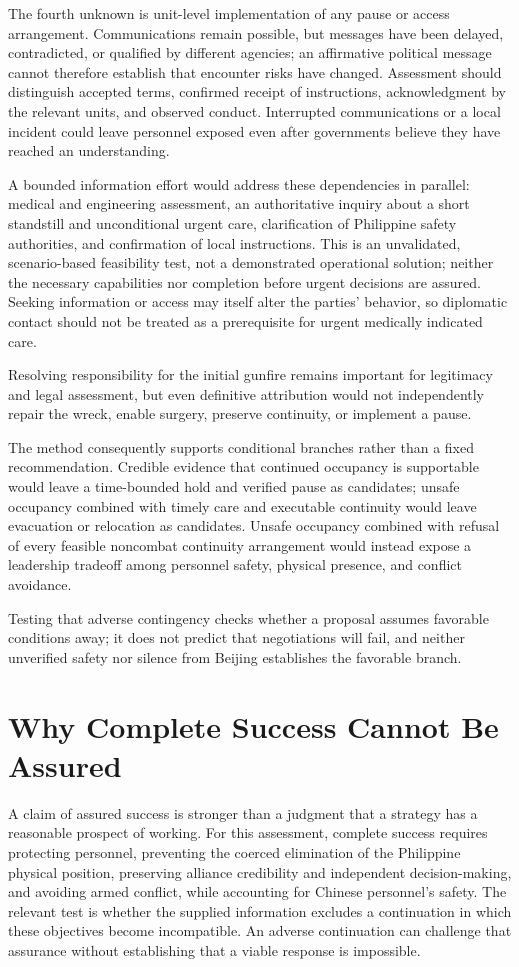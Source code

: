 \documentclass[11pt]{article}
\begin{document}
The fourth unknown is unit-level implementation of any pause or access arrangement. Communications remain possible, but messages have been delayed, contradicted, or qualified by different agencies; an affirmative political message cannot therefore establish that encounter risks have changed. Assessment should distinguish accepted terms, confirmed receipt of instructions, acknowledgment by the relevant units, and observed conduct. Interrupted communications or a local incident could leave personnel exposed even after governments believe they have reached an understanding.

A bounded information effort would address these dependencies in parallel: medical and engineering assessment, an authoritative inquiry about a short standstill and unconditional urgent care, clarification of Philippine safety authorities, and confirmation of local instructions. This is an unvalidated, scenario-based feasibility test, not a demonstrated operational solution; neither the necessary capabilities nor completion before urgent decisions are assured. Seeking information or access may itself alter the parties’ behavior, so diplomatic contact should not be treated as a prerequisite for urgent medically indicated care.

Resolving responsibility for the initial gunfire remains important for legitimacy and legal assessment, but even definitive attribution would not independently repair the wreck, enable surgery, preserve continuity, or implement a pause.

The method consequently supports conditional branches rather than a fixed recommendation. Credible evidence that continued occupancy is supportable would leave a time-bounded hold and verified pause as candidates; unsafe occupancy combined with timely care and executable continuity would leave evacuation or relocation as candidates. Unsafe occupancy combined with refusal of every feasible noncombat continuity arrangement would instead expose a leadership tradeoff among personnel safety, physical presence, and conflict avoidance.

Testing that adverse contingency checks whether a proposal assumes favorable conditions away; it does not predict that negotiations will fail, and neither unverified safety nor silence from Beijing establishes the favorable branch.

\section{Why Complete Success Cannot Be Assured}
A claim of assured success is stronger than a judgment that a strategy has a reasonable prospect of working. For this assessment, complete success requires protecting personnel, preventing the coerced elimination of the Philippine physical position, preserving alliance credibility and independent decision-making, and avoiding armed conflict, while accounting for Chinese personnel’s safety. The relevant test is whether the supplied information excludes a continuation in which these objectives become incompatible. An adverse continuation can challenge that assurance without establishing that a viable response is impossible.
\end{document}
